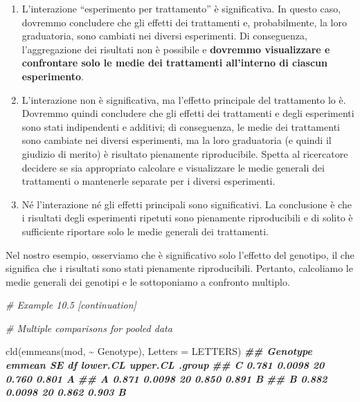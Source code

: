 \documentclass[
  12pt,
]{book}
\newenvironment{Shaded}{\begin{snugshade}}{\end{snugshade}}
\newcommand{\AttributeTok}[1]{\textcolor[rgb]{0.77,0.63,0.00}{#1}}
\newcommand{\CommentTok}[1]{\textcolor[rgb]{0.56,0.35,0.01}{\textit{#1}}}
\newcommand{\DocumentationTok}[1]{\textcolor[rgb]{0.56,0.35,0.01}{\textbf{\textit{#1}}}}
\newcommand{\FunctionTok}[1]{\textcolor[rgb]{0.00,0.00,0.00}{#1}}
\newcommand{\NormalTok}[1]{#1}
\newcommand{\SpecialCharTok}[1]{\textcolor[rgb]{0.00,0.00,0.00}{#1}}
\providecommand{\tightlist}{%
  \setlength{\itemsep}{0pt}\setlength{\parskip}{0pt}}
\begin{document}
\begin{enumerate}
\def\labelenumi{\arabic{enumi}.}
\tightlist
\item
  L'interazione ``esperimento per trattamento'' è significativa. In questo caso, dovremmo concludere che gli effetti dei trattamenti e, probabilmente, la loro graduatoria, sono cambiati nei diversi esperimenti. Di conseguenza, l'aggregazione dei risultati non è possibile e \textbf{dovremmo visualizzare e confrontare solo le medie dei trattamenti all'interno di ciascun esperimento}.
\item
  L'interazione non è significativa, ma l'effetto principale del trattamento lo è. Dovremmo quindi concludere che gli effetti dei trattamenti e degli esperimenti sono stati indipendenti e additivi; di conseguenza, le medie dei trattamenti sono cambiate nei diversi esperimenti, ma la loro graduatoria (e quindi il giudizio di merito) è risultato pienamente riproducibile. Spetta al ricercatore decidere se sia appropriato calcolare e visualizzare le medie generali dei trattamenti o mantenerle separate per i diversi esperimenti.
\item
  Né l'interazione né gli effetti principali sono significativi. La conclusione è che i risultati degli esperimenti ripetuti sono pienamente riproducibili e di solito è sufficiente riportare solo le medie generali dei trattamenti.
\end{enumerate}

Nel nostro esempio, osserviamo che è significativo solo l'effetto del genotipo, il che significa che i risultati sono stati pienamente riproducibili. Pertanto, calcoliamo le medie generali dei genotipi e le sottoponiamo a confronto multiplo.

\vspace{12pt}
\small

\begin{Shaded}
\begin{Highlighting}[]
\CommentTok{\# Example 10.5 [continuation]}

\CommentTok{\# Multiple comparisons for pooled data}

\FunctionTok{cld}\NormalTok{(}\FunctionTok{emmeans}\NormalTok{(mod, }\SpecialCharTok{\textasciitilde{}}\NormalTok{ Genotype), }\AttributeTok{Letters =}\NormalTok{ LETTERS)}
\DocumentationTok{\#\# Genotype  emmean     SE df  lower.CL upper.CL .group}
\DocumentationTok{\#\#  C         0.781 0.0098 20    0.760    0.801  A    }
\DocumentationTok{\#\#  A         0.871 0.0098 20    0.850    0.891   B   }
\DocumentationTok{\#\#  B         0.882 0.0098 20    0.862    0.903   B }
\end{Highlighting}
\end{Shaded}
\end{document}
